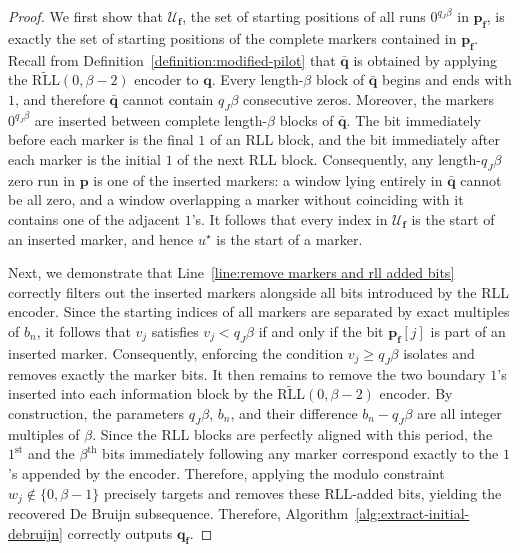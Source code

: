 \documentclass[journal,letterpaper,onecolumn,11pt]{IEEEtran}
\newcommand{\cU}{\mathcal{U}}
\newcommand{\boldf}{\mathbf{f}}
\newcommand{\boldp}{\mathbf{p}}
\newcommand{\boldq}{\mathbf{q}}
\begin{document}
\begin{proof}
We first show that \(\cU_{\boldf}\), the set of starting positions of all
runs \(0^{q_J\beta}\) in \(\boldp_{\boldf}\), is exactly the set of
starting positions of the complete markers contained in
\(\boldp_{\boldf}\).
Recall from Definition~\ref{definition:modified-pilot} that \(\bar{\boldq}\) is obtained by applying the
\(\widetilde{\mathrm{RLL}}(0,\beta-2)\) encoder to \(\boldq\). Every
length-\(\beta\) block of \(\bar{\boldq}\) begins and ends with \(1\), and
therefore \(\bar{\boldq}\) cannot contain \(q_J\beta\) consecutive zeros.
Moreover, the markers \(0^{q_J\beta}\) are inserted between complete
length-\(\beta\) blocks of \(\bar{\boldq}\). The bit immediately before
each marker is the final \(1\) of an RLL block, and the bit immediately after
each marker is the initial \(1\) of the next RLL block. Consequently, any
length-\(q_J\beta\) zero run in \(\boldp\) is one of the inserted markers:
a window lying entirely in \(\bar{\boldq}\) cannot be all zero, and a window
overlapping a marker without coinciding with it contains one of the adjacent
\(1\)'s. It follows that every index in \(\cU_{\boldf}\) is the start of an
inserted marker, and hence \(u^\star\) is the start of a  marker.

Next, we demonstrate that Line~\ref{line:remove markers and rll added bits} correctly filters out the inserted markers alongside all bits introduced by the RLL encoder.
Since the starting indices of all markers are separated by exact multiples of $b_n$, it follows that $v_j$ satisfies $v_j < q_J\beta$ if and only if the bit $\boldp_{\boldf}[j]$ is part of an inserted marker.
Consequently, enforcing the condition $v_j \geq q_J\beta$ isolates and removes exactly the marker bits.
It then remains to remove the two boundary $1$'s inserted into each information block by the $\widetilde{\mathrm{RLL}}(0,\beta-2)$ encoder. 
By construction, the parameters $q_J\beta$, $b_n$, and their difference $b_n - q_J\beta$ are all integer multiples of $\beta$. 
Since the RLL blocks are perfectly aligned with this period, the $1^{\text{st}}$ and the $\beta^{\text{th}}$ bits immediately following any marker correspond exactly to the $1$'s appended by the encoder. 
Therefore, applying the modulo constraint $w_j \notin \{0, \beta-1\}$ precisely targets and removes these RLL-added bits, yielding the recovered De Bruijn subsequence.
Therefore, Algorithm~\ref{alg:extract-initial-debruijn}
correctly outputs \(\boldq_{\boldf}\).
\end{proof}
\end{document}
